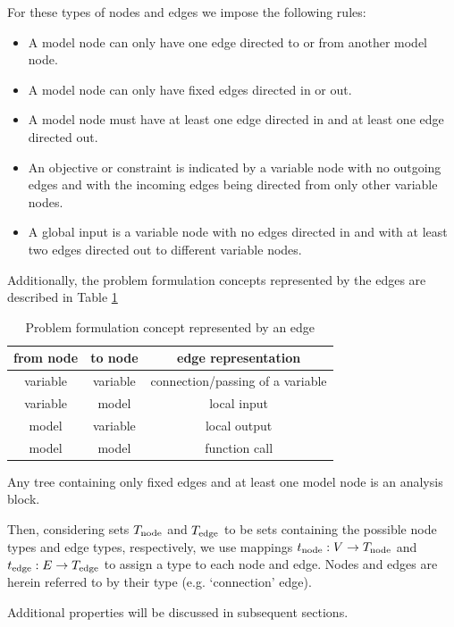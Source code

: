 For these types of nodes and edges we impose the following rules:
\begin{itemize}
\item A model node can only have one edge directed to or from another model node.
\item A model node can only have fixed edges directed in or out.
\item A model node must have at least one edge directed in and at least one edge directed out.
\item An objective or constraint is indicated by a variable node with no outgoing edges and with the incoming edges being directed from only other variable nodes.
\item A global input is a variable node with no edges directed in and with at least two edges directed out to different variable nodes.
\end{itemize}
Additionally, the problem formulation concepts represented by the edges are described in Table \ref{t:edge representation}
\begin{table}[h!]
 \begin{center}
  \caption{Problem formulation concept represented by an edge}
  \label{t:edge representation}
  \begin{tabular}{ccc} \hline 
from node & to node & edge representation \\ \hline
variable & variable & connection/passing of a variable\\
variable & model & local input \\
model & variable & local output \\
model & model & function call \\ \hline
  \end{tabular}
 \end{center}
 \vspace{-15pt}
\end{table}

Any tree containing only fixed edges and at least one model node is an analysis block.

Then, considering sets $T_\textrm{node}$ and $T_\textrm{edge}$ to be sets containing the possible node types and edge types, respectively, we use mappings $t_\textrm{node}:V \to T_\textrm{node}$ and $t_\textrm{edge}:E \to T_\textrm{edge}$ to assign a type to each node and edge. Nodes and edges are herein referred to by their type (e.g. `connection' edge). 

Additional properties will be discussed in subsequent sections.

